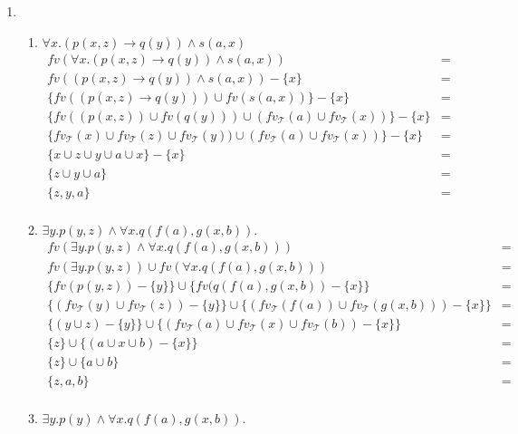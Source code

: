 \begin{enumerate}
\begin{enumerate}
		\end{enumerate}
		\item
		\begin{enumerate}
			\item $\forall x. (p(x,z)\rightarrow q(y)) \land s(a,x)$
				\[
				   \begin{array}{lcl}
				   	  fv(\forall x. (p(x,z)\rightarrow q(y)) \land s(a,x)) & = & \\
				   	  fv((p(x,z)\rightarrow q(y)) \land s(a,x)) - \{x\}& = & \\
				   	  \{fv((p(x,z)\rightarrow q(y))) \cup fv(s(a,x))\} - \{x\}& = & \\
				   	  \{fv((p(x,z))\cup fv(q(y))) \cup (fv_{\mathcal{T}}(a) \cup fv_{\mathcal{T}}(x))\} - \{x\}& = & \\
				   	  \{fv_{\mathcal{T}}(x) \cup fv_{\mathcal{T}}(z)\cup fv_{\mathcal{T}}(y)) \cup (fv_{\mathcal{T}}(a) \cup fv_{\mathcal{T}}(x))\} - \{x\}& = & \\
				   	  \{x \cup z\cup y \cup a \cup x\} - \{x\}& = & \\
				   	  \{ z\cup y \cup a \}& = & \\
				   	  \{ z, y, a \}& = & \\
				   \end{array}
				\]
			\item $\exists y. p(y,z) \land \forall x. q(f(a),g(x,b))$.
			\[
			  \begin{array}{lcl}
				   	  fv(\exists y. p(y,z) \land \forall x. q(f(a),g(x,b))) & = & \\
					  fv(\exists y. p(y,z)) \cup fv(\forall x. q(f(a),g(x,b))) & = & \\
					  \{fv(p(y,z)) - \{y\}\} \cup \{fv(q(f(a),g(x,b)) - \{x\}\} & = & \\
					  \{(fv_{\mathcal{T}}(y) \cup fv_{\mathcal{T}}(z)) - \{y\}\} \cup \{(fv_{\mathcal{T}}(f(a))\cup fv_{\mathcal{T}}(g(x,b))) - \{x\}\} & = & \\
					  \{(y \cup z) - \{y\}\} \cup \{(fv_{\mathcal{T}}(a)\cup fv_{\mathcal{T}}(x) \cup fv_{\mathcal{T}}(b)) - \{x\}\} & = & \\
					  \{z\} \cup \{(a \cup x \cup b) - \{x\}\} & = & \\
					  \{z\} \cup \{ a \cup b \} & = & \\
					  \{z, a, b \} & = & \\
			  \end{array}
			\]
			\item $\exists y. p(y) \land \forall x. q(f(a),g(x,b))$.

\end{enumerate}
\end{enumerate}

